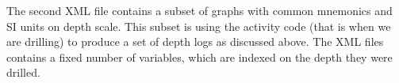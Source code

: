 \documentclass{article}
\theoremstyle{theorem}
\theoremstyle{definition}
\begin{document}
%
%


The second XML file contains a subset of graphs with common mnemonics and SI units on depth scale. This subset is using the activity code (that is when we are drilling) to produce a set of depth logs as discussed above. The XML files contains a fixed number of variables, which are indexed on the depth they were drilled.
\end{document}
